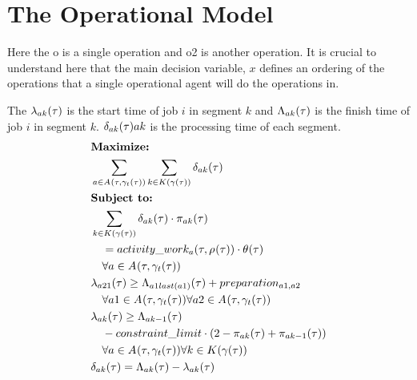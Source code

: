 \section{The Operational Model}

Here the o is a single operation and o2 is another operation. It is crucial to understand here that the main
decision variable, $x$ defines an ordering of the operations that a single operational agent will do the 
operations in. 

The $\lambda_{ak}(\tau)$ is the start time of job $i$ in segment $k$ and $\Lambda_{ak}(\tau)$ is the finish time of job $i$ in segment $k$.
$\delta_{ak}(\tau){a}{k}$ is the processing time of each segment. 
\begin{alignat}{2}
	& \textbf{Maximize:} \notag\\
	& \sum_{a \in \SetActivity{\VarSupervisorAssignment{}{t}}{}} \sum_{k \in \SetWorkSegment} \VarProcessingTime                                                         \\
	& \textbf{Subject to:} \notag                                                                                                                                       \\
    & \sum_{k \in \SetWorkSegment} \VarProcessingTime \cdot \VarActiveSegment{a}{k} \notag\\ 
	& \quad = \ParActivityWork{} \cdot \VarIncludeActivity \notag\\
	& \quad \forall a \in \SetActivity{\VarSupervisorAssignment{}{t}}{} \\
	& \VarStartOfSegment{a2}{1} \geq \VarFinishOfSegment{a1}{last(a1)} + \ParPreparation \notag                                                                       \\ 
	& \quad \forall a1 \in \SetActivity{\VarSupervisorAssignment{}{t}}{} \forall a2 \in \SetActivity{\VarSupervisorAssignment{}{t}}{}                                                     \\
	& \VarStartOfSegment{a}{k} \geq \VarFinishOfSegment{a}{k-1} \notag\\
	& \quad - \ParConstraintLimit \cdot (2 - \VarActiveSegment{a}{k} + \VarActiveSegment{a}{k-1})                \notag\\
	& \quad \forall a \in \SetActivity{\VarSupervisorAssignment{}{t}}{}\forall k \in \SetWorkSegment \\ 
	& \VarProcessingTime = \VarFinishOfSegment{a}{k} - \VarStartOfSegment{a}{k}                                                                                       \\

\end{alignat}
